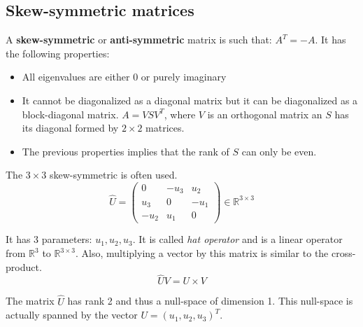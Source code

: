 \subsection{Skew-symmetric matrices}

A \textbf{skew-symmetric} or \textbf{anti-symmetric} matrix is such that: $A^T = -A$. It has the following properties:

\begin{itemize}
    \item All eigenvalues are either 0 or purely imaginary
    \item It cannot be diagonalized as a diagonal matrix but it can be diagonalized as a block-diagonal matrix.
    $A = V S V^T$, where $V$ is an orthogonal matrix an $S$ has its diagonal formed by $2\times 2$ matrices.
    \item The previous properties implies that the rank of $S$ can only be even.
\end{itemize}

The $3\times 3$ skew-symmetric is often used.
\begin{equation}
    \hat{U} = \left( \begin{array}{ccc}
        0 & -u_3 & u_2 \\
        u_3 & 0 & -u_1 \\
        -u_2 & u_1 & 0 
    \end{array} \right)
    \in \mathbb{R}^{3\times 3}
\end{equation}

It has 3 parameters: $u_1, u_2, u_3$.
It is called \textit{hat operator} and is a linear operator from $\mathbb{R}^3$ to $\mathbb{R}^{3\times 3}$. Also, multiplying a vector by this matrix is similar to the cross-product.
\begin{equation}
    \hat{U} V = U \times V
\end{equation}

The matrix $\hat{U}$ has rank 2 and thus a null-space of dimension 1. This null-space is actually spanned by the vector $U = (u_1, u_2, u_3)^T$.


